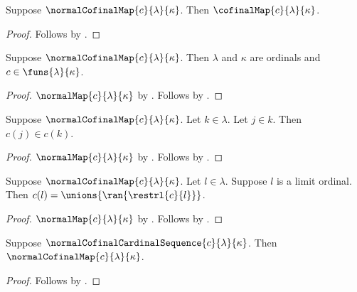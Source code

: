 \begin{proposition}\label{normal_cofinal_map_is_cofinal}
    Suppose $\normalCofinalMap{c}{\lambda}{\kappa}$.
    Then $\cofinalMap{c}{\lambda}{\kappa}$.
\end{proposition}
\begin{proof}
    Follows by .
\end{proof}

\begin{proposition}\label{normal_cofinal_map_type}
    Suppose $\normalCofinalMap{c}{\lambda}{\kappa}$.
    Then $\lambda$ and $\kappa$ are ordinals and
        $c\in\funs{\lambda}{\kappa}$.
\end{proposition}
\begin{proof}
    $\normalMap{c}{\lambda}{\kappa}$
        by .
    Follows by .
\end{proof}

\begin{proposition}\label{normal_cofinal_map_increasing}
    Suppose $\normalCofinalMap{c}{\lambda}{\kappa}$.
    Let $k\in\lambda$.
    Let $j\in k$.
    Then $c(j)\in c(k)$.
\end{proposition}
\begin{proof}
    $\normalMap{c}{\lambda}{\kappa}$
        by .
    Follows by .
\end{proof}

\begin{proposition}\label{normal_cofinal_map_continuous}
    Suppose $\normalCofinalMap{c}{\lambda}{\kappa}$.
    Let $l\in\lambda$.
    Suppose $l$ is a limit ordinal.
    Then $c(l)=\unions{\ran{\restrl{c}{l}}}$.
\end{proposition}
\begin{proof}
    $\normalMap{c}{\lambda}{\kappa}$
        by .
    Follows by .
\end{proof}

\begin{proposition}\label{normal_cofinal_cardinal_sequence_is_normal_cofinal}
    Suppose $\normalCofinalCardinalSequence{c}{\lambda}{\kappa}$.
    Then $\normalCofinalMap{c}{\lambda}{\kappa}$.
\end{proposition}
\begin{proof}
    Follows by .
\end{proof}

